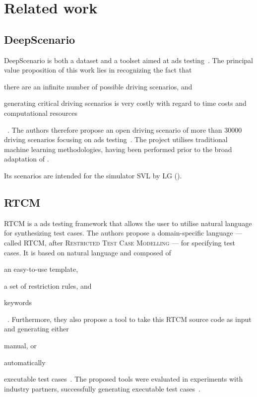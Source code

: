 \chapter{Related work}\label{sec:relatedWork}

\section{DeepScenario}\label{sec:deepScenario}

DeepScenario is both a dataset and a toolset aimed at \acrlong{ads} testing~\cite{DeepScenario}. The
principal value proposition of this work lies in recognizing the fact that \begin{inparaenum}
  \item there are an infinite number of possible driving scenarios, and
  \item generating critical driving scenarios is very costly with regard to time costs and
  computational resources\end{inparaenum}~\cite[52]{DeepScenario}. The authors therefore propose
an open driving scenario of more than \num{30000} driving scenarios focusing on \acrshort{ads}
testing~\cite[52]{DeepScenario}. The project utilises traditional machine learning
methodologies, having been performed prior to the broad adaptation of .

Its scenarios are intended for the simulator SVL by LG ().

\section{RTCM}

RTCM is a \acrshort{ads} testing framework that allows the user to utilise natural language for
synthesizing test cases. The authors propose a domain-specific language --- called RTCM, after
\textsc{Restricted Test Case Modelling} --- for specifying test cases. It is based on natural language
and composed of \begin{inparaenum}
  \item an easy-to-use template,
  \item a set of restriction rules, and
  \item keywords \end{inparaenum}~\cite[397]{RTCM}.  Furthermore, they also propose a tool to
take this RTCM source code as input and generating either \begin{inparaenum}
  \item manual, or
  \item automatically \end{inparaenum} executable test cases~\cite[397]{RTCM}. The proposed tools
were evaluated in experiments with industry partners, successfully generating executable test
cases~\cite[397]{RTCM}.

